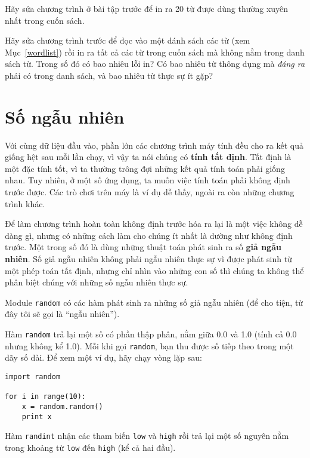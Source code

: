 \documentclass[11pt]{book}
\begin{document}
\begin{ex}
Hãy sửa chương trình ở bài tập trước để in ra 20 từ được
dùng thường xuyên nhất trong cuốn sách.
\end{ex}


\begin{ex}
Hãy sửa chương trình trước để đọc vào một dánh sách các từ (xem
Mục~\ref{wordlist}) rồi in ra tất cả các từ trong cuốn sách mà không
nằm trong danh sách từ. Trong số đó có bao nhiêu lỗi in? Có bao nhiêu
từ thông dụng mà {\em đáng ra} phải có trong danh sách,
và bao nhiêu từ thực sự ít gặp?
\end{ex}


\section{Số ngẫu nhiên}


Với cùng dữ liệu đầu vào, phần lớn các chương trình máy tính đều
cho ra kết quả giống hệt sau mỗi lần chạy, vì vậy ta nói chúng có
{\bf tính tất định}.
Tất định là một đặc tính tốt, vì ta thường trông đợi những kết quả
tính toán phải giống nhau. Tuy nhiên, ở một số ứng dụng, ta muốn
việc tính toán phải không định trước được. Các trò chơi trên máy
là ví dụ dễ thấy, ngoài ra còn những chương trình khác.

Để làm chương trình hoàn toàn không định trước hóa ra lại là một việc
không dễ dàng gì, nhưng có những cách làm cho chúng ít nhất là 
dường như không định trước. Một trong số đó là dùng những thuật toán
phát sinh ra số {\bf giả ngẫu nhiên}.
Số giả ngẫu nhiên không phải ngẫu nhiên thực sự vì được phát sinh từ
một phép toán tất định, nhưng chỉ nhìn vào những con số thì chúng ta
không thể phân biệt chúng với những số ngẫu nhiên thực sự.


Module {\tt random} có các hàm phát sinh ra những số giả ngẫu nhiên
(để cho tiện, từ đây tôi sẽ gọi là ``ngẫu nhiên'').


Hàm {\tt random} trả lại một số có phần thập phân, nằm giữa
0.0 và 1.0 (tính cả 0.0 nhưng không kể 1.0). Mỗi khi gọi
{\tt random}, bạn thu được số tiếp theo trong một dãy số dài. Để xem
một ví dụ, hãy chạy vòng lặp sau:

\beforeverb
\begin{verbatim}
import random

for i in range(10):
    x = random.random()
    print x
\end{verbatim}
\afterverb
%
Hàm {\tt randint} nhận các tham biến {\tt low} và
{\tt high} rồi trả lại một số nguyên nằm trong khoảng từ {\tt low} đến
{\tt high} (kể cả hai đầu).
\end{document}
